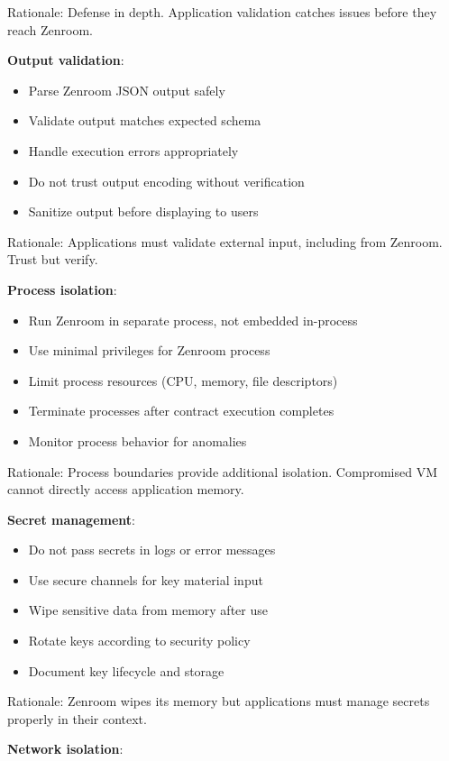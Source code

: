 Rationale: Defense in depth. Application validation catches issues
before they reach Zenroom.

\textbf{Output validation}:

\begin{itemize}
\item Parse Zenroom JSON output safely
\item Validate output matches expected schema
\item Handle execution errors appropriately
\item Do not trust output encoding without verification
\item Sanitize output before displaying to users
\end{itemize}

Rationale: Applications must validate external input, including from
Zenroom. Trust but verify.

\textbf{Process isolation}:

\begin{itemize}
\item Run Zenroom in separate process, not embedded in-process
\item Use minimal privileges for Zenroom process
\item Limit process resources (CPU, memory, file descriptors)
\item Terminate processes after contract execution completes
\item Monitor process behavior for anomalies
\end{itemize}

Rationale: Process boundaries provide additional
isolation. Compromised VM cannot directly access application memory.

\textbf{Secret management}:

\begin{itemize}
\item Do not pass secrets in logs or error messages
\item Use secure channels for key material input
\item Wipe sensitive data from memory after use
\item Rotate keys according to security policy
\item Document key lifecycle and storage
\end{itemize}

Rationale: Zenroom wipes its memory but applications must manage
secrets properly in their context.

\textbf{Network isolation}:

